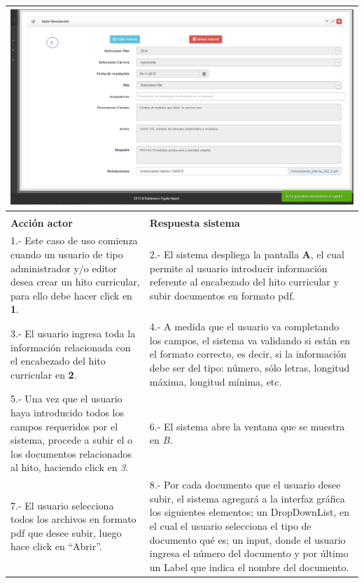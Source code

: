 \begin{longtable}{p{7cm}| p{7cm}}
				
				\multicolumn{2}{c}{\includegraphics[width=1\textwidth]{images/Capitulo_3/subir_documento6.png}} \\ \hline
				
				\rowcolor{LightBlue2}  \multicolumn{2}{c}{Curso normal de eventos} \\ 
				
				\textbf{Acción actor} &	\textbf{Respuesta sistema} \\ \hline
				
				1.- Este caso de uso comienza cuando un usuario de tipo administrador y/o editor  desea crear un hito curricular, para ello debe hacer click en \textbf{1}.
				&	2.- El sistema despliega la pantalla \textbf{A}, el cual permite al usuario  introducir información referente al encabezado del hito curricular y subir documentos en formato pdf.\\ \hline
			
			
				3.- El usuario ingresa toda la información relacionada con el encabezado del hito curricular en \textbf{2}.
				& 4.- A medida que el usuario va completando los campos, el sistema va validando si están en el formato correcto, es decir, si la información debe ser del tipo: número, sólo letras, longitud máxima, longitud mínima, etc.\\ \hline
				
				5.- Una vez que el usuario haya introducido todos los campos requeridos por el sistema, procede a subir el o los documentos relacionados al hito, haciendo click en \textit{3}.
				& 6.- El sistema abre la ventana que se muestra en \textit{B}.\\ \hline
				
				7.- El usuario selecciona todos los archivos en formato pdf que desee subir, luego hace click en ``Abrir''.
				& 8.- Por cada documento que el usuario desee subir, el sistema  agregará a la interfaz gráfica los siguientes elementos; un DropDownList, en el cual el usuario selecciona el  tipo de documento qué es; un input, donde el usuario ingresa el número del documento y por último un Label que indica el nombre del documento.\\ \hline
				

\end{longtable}
